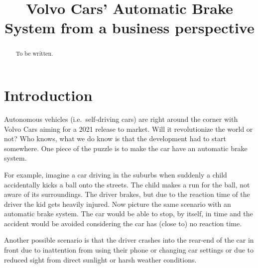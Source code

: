 \documentclass[conference]{IEEEtran}
\begin{document}
\title{Volvo Cars' Automatic Brake System from a business perspective}

\author{
\and
{}
}

\maketitle

\begin{abstract}
To be written.
\end{abstract}


\section{Introduction}
Autonomous vehicles (i.e.\ self-driving cars) are right around the corner with Volvo Cars aiming for a 2021 release to market. \cite{ADToMarket} Will it revolutionize the world or not? Who knows, what we do know is that the development had to start somewhere. One piece of the puzzle is to make the car have an automatic brake system. 

For example, imagine a car driving in the suburbs when suddenly a child accidentally kicks a ball onto the streets. The child makes a run for the ball, not aware of its surroundings. The driver brakes, but due to the reaction time of the driver the kid gets heavily injured. Now picture the same scenario with an automatic brake system. The car would be able to stop, by itself, in time and the accident would be avoided considering the car has (close to) no reaction time.

Another possible scenario is that the driver crashes into the rear-end of the car in front due to inattention from using their phone or changing car settings or due to reduced sight from direct sunlight or harsh weather conditions.
\end{document}
